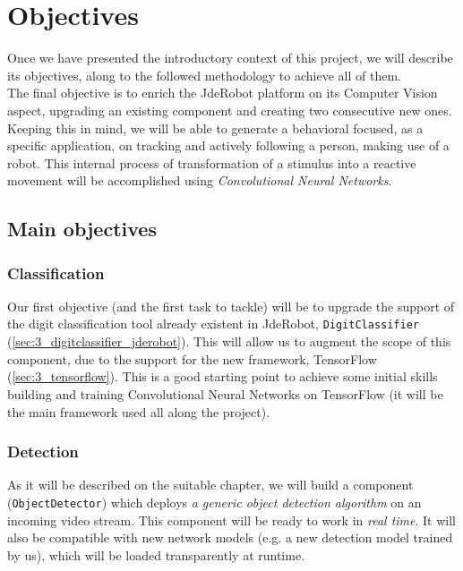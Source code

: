 \chapter{Objectives}
\label{chap:2_objectives}
Once we have presented the introductory context of this project, we will describe its objectives, along to the followed methodology to achieve all of them.\\

The final objective is to enrich the JdeRobot platform on its Computer Vision aspect, upgrading an existing component and creating two consecutive new ones. Keeping this in mind, we will be able to generate a behavioral focused, as a specific application, on tracking and actively following a person, making use of a robot. This internal process of transformation of a stimulus into a reactive movement will be accomplished using \textit{Convolutional Neural Networks}.\\


\section{Main objectives}

		\subsection{Classification}
			Our first objective (and the first task to tackle) will be to upgrade the support of the digit classification tool already existent in JdeRobot, \texttt{DigitClassifier} (\autoref{sec:3_digitclassifier_jderobot}). This will allow us to augment the scope of this component, due to the support for the new framework, TensorFlow (\autoref{sec:3_tensorflow}). This is a good starting point to achieve some initial skills building and training Convolutional Neural Networks on TensorFlow (it will be the main framework used all along the project).\\
		
		
		\subsection{Detection}
			As it will be described on the suitable chapter, we will build a component (\texttt{ObjectDetector}) which deploys \textit{a generic object detection algorithm} on an incoming video stream. This component will be ready to work in \emph{real time}. It will also be compatible with new network models (e.g. a new detection model trained by us), which will be loaded transparently at runtime.\\
			
